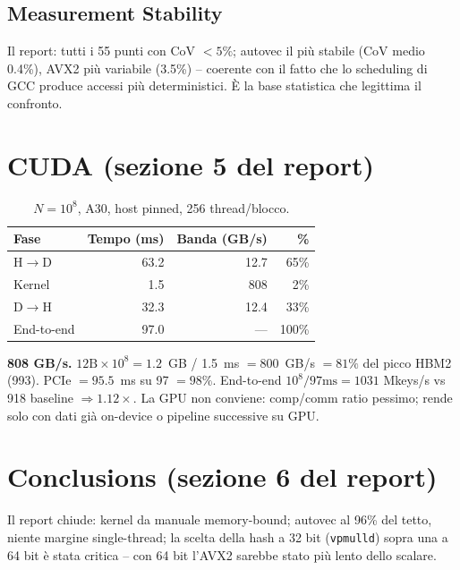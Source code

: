 \documentclass[11pt,a4paper]{article}
\begin{document}
\subsection{Measurement Stability}

Il report: tutti i 55 punti con CoV $<5\%$; autovec il più stabile (CoV medio 0.4\%), AVX2 più variabile (3.5\%) -- coerente con il fatto che lo scheduling di GCC produce accessi più deterministici. È la base statistica che legittima il confronto.

\section{CUDA (sezione 5 del report)}

\begin{table}[H]\centering\small
\begin{tabular}{@{}lrrr@{}}\toprule
Fase & Tempo (ms) & Banda (GB/s) & \% \\\midrule
H$\to$D & 63.2 & 12.7 & 65\% \\ Kernel & 1.5 & 808 & 2\% \\ D$\to$H & 32.3 & 12.4 & 33\% \\\midrule
End-to-end & 97.0 & --- & 100\% \\\bottomrule
\end{tabular}\caption{$N=10^8$, A30, host pinned, 256 thread/blocco.}
\end{table}

\begin{deriv}
\textbf{808 GB/s.} $12\text{B}\times10^8=1.2$~GB / 1.5~ms $=800$~GB/s $=81\%$ del picco HBM2 (993). PCIe $=95.5$~ms su 97 $=98\%$. End-to-end $10^8/97\text{ms}=1031$ Mkeys/s vs 918 baseline $\Rightarrow1.12\times$. La GPU non conviene: comp/comm ratio pessimo; rende solo con dati già on-device o pipeline successive su GPU.
\end{deriv}

\section{Conclusions (sezione 6 del report)}

Il report chiude: kernel da manuale memory-bound; autovec al 96\% del tetto, niente margine single-thread; la scelta della hash a 32 bit (\texttt{vpmulld}) sopra una a 64 bit è stata critica -- con 64 bit l'AVX2 sarebbe stato più lento dello scalare.
\end{document}
